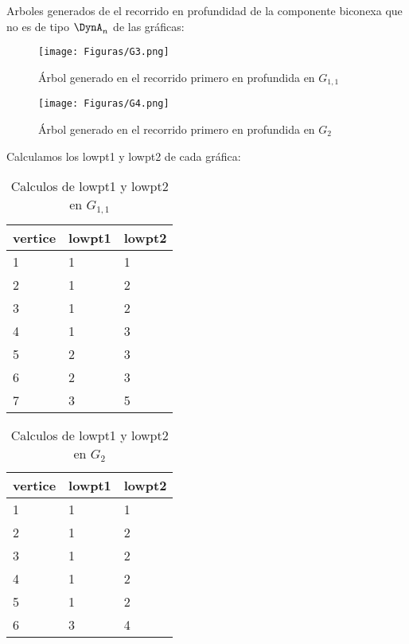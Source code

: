 Arboles generados de el recorrido en profundidad de la componente biconexa que no es de tipo $\DynA_{n}$ de las gráficas:
\begin{figure}[H]
\centering
\texttt{[image: Figuras/G3.png]}
\caption{Árbol generado en el recorrido primero en profundida en $G_{1, 1}$}
\label{figura:recorridoG1}
\end{figure}

\begin{figure}[H]
\centering
\texttt{[image: Figuras/G4.png]}
\caption{Árbol generado en el recorrido primero en profundida en $G_{2}$}
\label{figura:recorridoG2}
\end{figure}

Calculamos los lowpt1 y lowpt2 de cada gráfica:
\begin{table}[H]
\begin{center}
\begin{tabular}{lll}
\toprule
vertice & lowpt1 & lowpt2 \\
\midrule
      1 &      1 &      1 \\
      2 &      1 &      2 \\
      3 &      1 &      2 \\
      4 &      1 &      3 \\
      5 &      2 &      3 \\
      6 &      2 &      3 \\
      7 &      3 &      5 \\
\bottomrule
\end{tabular}
\caption{Calculos de lowpt1 y lowpt2 en $G_{1,1}$}
\end{center}
\end{table}

\begin{table}[H]
\begin{center}
\begin{tabular}{lll}
\toprule
vertice & lowpt1 & lowpt2 \\
\midrule
      1 &      1 &      1 \\
      2 &      1 &      2 \\
      3 &      1 &      2 \\
      4 &      1 &      2 \\
      5 &      1 &      2 \\
      6 &      3 &      4 \\
\bottomrule
\end{tabular}
\caption{Calculos de lowpt1 y lowpt2 en $G_{2}$}
\end{center}
\end{table}

